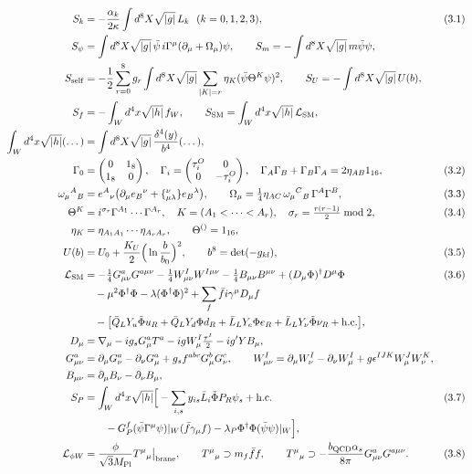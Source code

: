 \documentclass[10pt,a4paper]{article}
\begin{document}
\begin{align*}
S_k&=-\frac{\alpha_k}{2\kappa}\int d^8X\sqrt{|g|}\,L_k\ \ (k=0,1,2,3),&&(3.1) \\
S_\psi&=\int d^8X\sqrt{|g|}\,\bar\psi\,i\Gamma^\mu(\partial_\mu+\Omega_\mu)\psi,\qquad S_m=-\int d^8X\sqrt{|g|}\,m\bar\psi\psi, \\
S_{\rm self}&=-\frac12\sum_{r=0}^8g_r\int d^8X\sqrt{|g|}\sum_{|K|=r}\eta_K(\bar\psi\Theta^K\psi)^2,\qquad S_U=-\int d^8X\sqrt{|g|}\,U(b), \\
S_f&=-\int_Wd^4x\sqrt{|h|}\,f_W,\qquad S_{\rm SM}=\int_Wd^4x\sqrt{|h|}\,\mathcal L_{\rm SM}, \\
\int_Wd^4x\sqrt{|h|}(\dots)&=\int d^8X\sqrt{|g|}\,\frac{\delta^4(y)}{b^4}(\dots), \\
\Gamma_0&=\begin{pmatrix}0&1_8\\1_8&0\end{pmatrix},\quad \Gamma_i=\begin{pmatrix}\tau^O_i&0\\0&-\tau^O_i\end{pmatrix},\quad \Gamma_A\Gamma_B+\Gamma_B\Gamma_A=2\eta_{AB}1_{16},&&(3.2) \\
\omega_\mu{}^A{}_B&=e^A{}_\nu\big(\partial_\mu e_B{}^\nu+\{{}^{\nu}_{\mu\lambda}\}e_B{}^\lambda\big),\qquad \Omega_\mu=\tfrac14\eta_{AC}\,\omega_\mu{}^C{}_B\,\Gamma^A\Gamma^B,&&(3.3) \\
\Theta^K&=i^{\sigma_r}\Gamma^{A_1}\cdots\Gamma^{A_r},\quad K=(A_1<\dots<A_r),\quad \sigma_r=\tfrac{r(r-1)}2\bmod2,&&(3.4) \\
\eta_K&=\eta_{A_1A_1}\cdots\eta_{A_rA_r},\qquad \Theta^{()}=1_{16}, \\
U(b)&=U_0+\frac{K_U}2\Big(\ln\frac b{b_0}\Big)^2,\qquad b^8=\det(-g_{kl}),&&(3.5) \\
\mathcal L_{\rm SM}&=-\tfrac14G^a_{\mu\nu}G^{a\mu\nu}-\tfrac14W^I_{\mu\nu}W^{I\mu\nu}-\tfrac14B_{\mu\nu}B^{\mu\nu}+(D_\mu\Phi)^\dagger D^\mu\Phi&&(3.6) \\
&\quad-\mu^2\Phi^\dagger\Phi-\lambda(\Phi^\dagger\Phi)^2+\sum_f\bar fi\gamma^\mu D_\mu f \\
&\quad-\big[\bar Q_LY_u\tilde\Phi u_R+\bar Q_LY_d\Phi d_R+\bar L_LY_e\Phi e_R+\bar L_LY_\nu\tilde\Phi\nu_R+\text{h.c.}\big], \\
D_\mu&=\nabla_\mu-ig_sG^a_\mu T^a-igW^I_\mu\tfrac{\tau^I}2-ig^\prime YB_\mu, \\
G^a_{\mu\nu}&=\partial_\mu G^a_\nu-\partial_\nu G^a_\mu+g_sf^{abc}G^b_\mu G^c_\nu,\qquad W^I_{\mu\nu}=\partial_\mu W^I_\nu-\partial_\nu W^I_\mu+g\epsilon^{IJK}W^J_\mu W^K_\nu, \\
B_{\mu\nu}&=\partial_\mu B_\nu-\partial_\nu B_\mu, \\
S_P&=\int_Wd^4x\sqrt{|h|}\Big[-\sum_{i,s}y_{is}\bar L_i\tilde\Phi P_R\psi_s+\text{h.c.}&&(3.7) \\
&\qquad-G^f_P(\bar\psi\Gamma^\mu\psi)|_W(\bar f\gamma_\mu f)-\lambda_P\Phi^\dagger\Phi(\bar\psi\psi)|_W\Big], \\
\mathcal L_{\phi W}&=\frac{\phi}{\sqrt3M_{\rm Pl}}T^\mu{}_\mu\big|_{\rm brane},\qquad T^\mu{}_\mu\supset m_f\bar ff,\qquad T^\mu{}_\mu\supset-\frac{b_{\rm QCD}\alpha_s}{8\pi}G^a_{\mu\nu}G^{a\mu\nu}.&&(3.8)
\end{align*}
\end{document}

